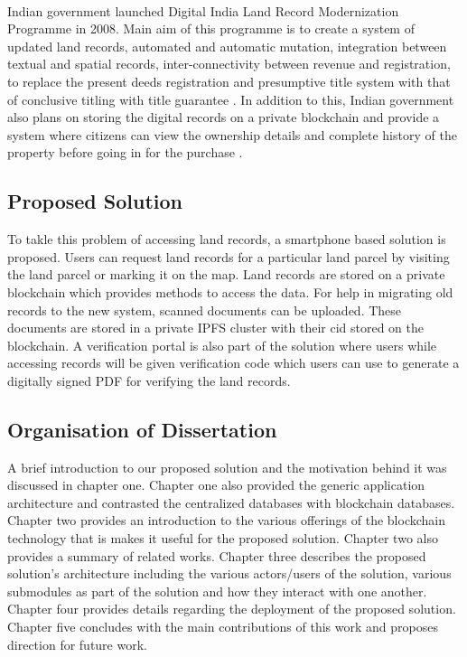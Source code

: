 \documentclass{article}
\begin{document}
        \paragraph{}
        Indian government launched Digital India Land Record Modernization Programme in 2008. Main aim of this programme is to create a system of updated land records, automated and automatic mutation, integration between textual and spatial records, inter-connectivity between revenue and registration, to replace the present deeds registration and presumptive title system with that of conclusive titling with title guarantee \cite{dilrmp}. In addition to this, Indian government also plans on storing the digital records on a private blockchain and provide a system where citizens can view the ownership details and complete history of the property before going in for the purchase \cite{blockchaingovin}.  

    \subsection{Proposed Solution}
        To takle this problem of accessing land records, a smartphone based solution is proposed. Users can request land records for a particular land parcel by visiting the land parcel or marking it on the map. Land records are stored on a private blockchain which provides methods to access the data. For help in migrating old records to the new system, scanned documents can be uploaded. These documents are stored in a private IPFS cluster with their \gls{cid} stored on the blockchain. A verification portal is also part of the solution where users while accessing records will be given verification code which users can use to generate a digitally signed PDF for verifying the land records. 
        
    \subsection{Organisation of Dissertation}
        A brief introduction to our proposed solution and the motivation behind it was discussed in chapter one. Chapter one also provided the generic application architecture and contrasted the centralized databases with blockchain databases. Chapter two provides an introduction to the various offerings of the blockchain technology that is makes it useful for the proposed solution. Chapter two also provides a summary of related works. Chapter three describes the proposed solution's architecture including the various actors/users of the solution, various submodules as part of the solution and how they interact with one another. Chapter four provides details regarding the deployment of the proposed solution. Chapter five concludes with the main contributions of this work and proposes direction for future work.
        
\end{document}
